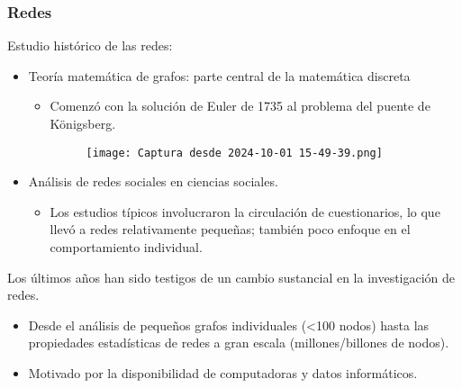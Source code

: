 \documentclass[11pt]{beamer}
\begin{document}
\begin{frame}[allowframebreaks]
\frametitle{Redes}
Estudio histórico de las redes:
    \begin{itemize}
        \item Teoría matemática de grafos: parte central de la matemática discreta
\begin{itemize}
    \item Comenzó con la solución de Euler de 1735 al problema del puente de Königsberg.
    \begin{figure}
        \centering
        \texttt{[image: Captura desde 2024-10-01 15-49-39.png]}
        \label{fig:enter-label}
    \end{figure}
\end{itemize}
\item Análisis de redes sociales en ciencias sociales.
\begin{itemize}
    \item Los estudios típicos involucraron la circulación de cuestionarios, lo que llevó a redes relativamente pequeñas; también poco enfoque en el comportamiento individual.
\end{itemize}
    \end{itemize}

Los últimos años han sido testigos de un cambio sustancial en la investigación de redes.
\begin{itemize}
    \item Desde el análisis de pequeños grafos individuales (<100 nodos) hasta las propiedades estadísticas de redes a gran escala (millones/billones de nodos).
        \item Motivado por la disponibilidad de computadoras y datos informáticos.
\end{itemize} 
\end{frame}
\end{document}
